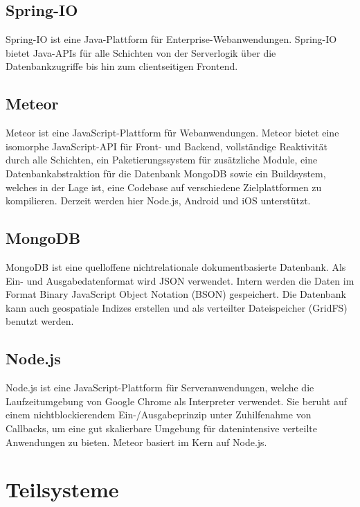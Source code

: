 \subsection{Spring-IO}
\label{ch:fachlichesUmfeld:Technologien:Spring}

Spring-IO ist eine Java-Plattform für Enterprise-Webanwendungen. Spring-IO bietet
Java-APIs für alle Schichten von der Serverlogik über die Datenbankzugriffe bis
hin zum clientseitigen Frontend.

\subsection{Meteor}
\label{ch:fachlichesUmfeld:Technologien:Meteor}

Meteor ist eine JavaScript-Plattform für Webanwendungen. Meteor bietet eine isomorphe
JavaScript-API  für Front- und Backend, vollständige Reaktivität durch alle
Schichten, ein Paketierungssystem für zusätzliche Module, eine
Datenbankabstraktion für die Datenbank MongoDB sowie ein Buildsystem, welches in
der Lage ist, eine Codebase auf verschiedene Zielplattformen zu kompilieren.
Derzeit werden hier Node.js, Android und iOS unterstützt.

\subsection{MongoDB}
\label{ch:fachlichesUmfeld:Technologien:MongoDB}

MongoDB ist eine quelloffene nichtrelationale dokumentbasierte Datenbank. Als
Ein- und Ausgabedatenformat wird JSON verwendet. Intern werden die Daten im
Format Binary JavaScript Object Notation (BSON) gespeichert. Die Datenbank kann
auch geospatiale Indizes erstellen und als verteilter Dateispeicher (GridFS)
benutzt werden.

\subsection{Node.js}
\label{ch:fachlichesUmfeld:Technologien:Node.js}

Node.js ist eine JavaScript-Plattform für Serveranwendungen, welche die
Laufzeitumgebung von Google Chrome als Interpreter verwendet. Sie beruht auf
einem nichtblockierendem Ein-/Ausgabeprinzip unter Zuhilfenahme von Callbacks,
um eine gut skalierbare Umgebung für datenintensive verteilte Anwendungen zu
bieten. Meteor basiert im Kern auf Node.js.

\section{Teilsysteme}
\label{ch:fachlichesUmfeld:Teilsysteme}

